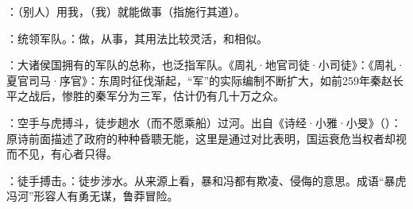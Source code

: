 {
\item {}：（别人）用我，（我）就能做事（指施行其道）。

\item {}：统领军队。：做，从事，其用法比较灵活，和相似。

：大诸侯国拥有的军队的总称，也泛指军队。《周礼·地官司徒·小司徒》：《周礼·夏官司马·序官》：东周时征伐渐起，“军”的实际编制不断扩大，如前259年秦赵长平之战后，惨胜的秦军分为三军，估计仍有几十万之众。 %

\item {}：空手与虎搏斗，徒步趟水（而不愿乘船）过河。出自《诗经·小雅·小旻》（）：原诗前面描述了政府的种种昏聩无能，这里是通过对比表明，国运衰危当权者却视而不见，有心者只得。

：徒手搏击。：徒步涉水。从来源上看，暴和冯都有欺凌、侵侮的意思。成语“暴虎冯河”形容人有勇无谋，鲁莽冒险。
}
{}


